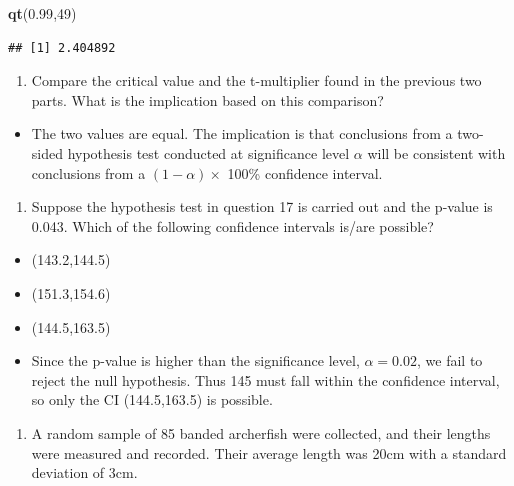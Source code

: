 \documentclass[
  openany]{book}
\newenvironment{Shaded}{\begin{snugshade}}{\end{snugshade}}
\newcommand{\DecValTok}[1]{\textcolor[rgb]{0.00,0.00,0.81}{#1}}
\newcommand{\FloatTok}[1]{\textcolor[rgb]{0.00,0.00,0.81}{#1}}
\newcommand{\FunctionTok}[1]{\textcolor[rgb]{0.13,0.29,0.53}{\textbf{#1}}}
\newcommand{\NormalTok}[1]{#1}
\providecommand{\tightlist}{%
  \setlength{\itemsep}{0pt}\setlength{\parskip}{0pt}}
\begin{document}
\begin{Shaded}
\begin{Highlighting}[]
\FunctionTok{qt}\NormalTok{(}\FloatTok{0.99}\NormalTok{,}\DecValTok{49}\NormalTok{)}
\end{Highlighting}
\end{Shaded}

\begin{verbatim}
## [1] 2.404892
\end{verbatim}

\begin{enumerate}
\def\labelenumi{\arabic{enumi}.}
\setcounter{enumi}{18}
\tightlist
\item
  Compare the critical value and the t-multiplier found in the previous two parts. What is the implication based on this comparison?
\end{enumerate}

\begin{itemize}
\tightlist
\item
  The two values are equal. The implication is that conclusions from a two-sided hypothesis test conducted at significance level \(\alpha\) will be consistent with conclusions from a \((1-\alpha) \times\) 100\% confidence interval.
\end{itemize}

\begin{enumerate}
\def\labelenumi{\arabic{enumi}.}
\setcounter{enumi}{19}
\tightlist
\item
  Suppose the hypothesis test in question 17 is carried out and the p-value is 0.043. Which of the following confidence intervals is/are possible?
\end{enumerate}

\begin{itemize}
\item
  (143.2,144.5)
\item
  (151.3,154.6)
\item
  (144.5,163.5)
\item
  Since the p-value is higher than the significance level, \(\alpha=0.02\), we fail to reject the null hypothesis. Thus 145 must fall within the confidence interval, so only the CI (144.5,163.5) is possible.
\end{itemize}

\begin{enumerate}
\def\labelenumi{\arabic{enumi}.}
\setcounter{enumi}{20}
\tightlist
\item
  A random sample of 85 banded archerfish were collected, and their lengths were measured and recorded. Their average length was 20cm with a standard deviation of 3cm.
\end{enumerate}
\end{document}
